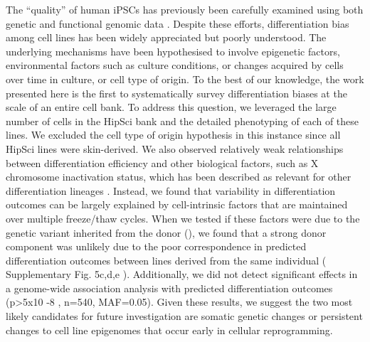 The “quality” of human iPSCs has previously been carefully examined using both genetic and functional genomic data \cite{muller2011bioinformatic, international2018assessment, tsankov2015qpcr, bock2011reference}. 
Despite these efforts, differentiation bias among cell lines has been widely appreciated but poorly understood. 
The underlying mechanisms have been hypothesised to involve epigenetic factors, environmental factors such as culture conditions, or changes acquired by cells over time in culture, or cell type of origin. 
To the best of our knowledge, the work presented here is the first to systematically survey differentiation biases at the scale of an entire cell bank. 
To address this question, we leveraged the large number of cells in the HipSci bank and the detailed phenotyping of each of these lines. 
We excluded the cell type of origin hypothesis \cite{hu2016effects} in this instance since all HipSci lines were skin-derived.
We also observed relatively weak relationships between differentiation efficiency and other biological factors, such as X chromosome inactivation status, which has been described as relevant for other differentiation lineages \cite{cuomo2020single}.
Instead, we found that variability in differentiation outcomes can be largely explained by cell-intrinsic factors that are maintained over multiple freeze/thaw cycles. 
When we tested if these factors were due to the genetic variant inherited from the donor (\cite{kajiwara2012donor}), we found that a strong donor component was unlikely due to the poor
correspondence in predicted differentiation outcomes between lines derived from the same individual ( Supplementary Fig. 5c,d,e ). 
Additionally, we did not detect significant effects in a genome-wide association analysis with predicted differentiation outcomes (p>5x10 -8 , n=540, MAF=0.05). 
Given these results, we suggest the two most likely candidates for future investigation are somatic genetic changes or persistent changes to cell line epigenomes that occur early in cellular reprogramming.\\

